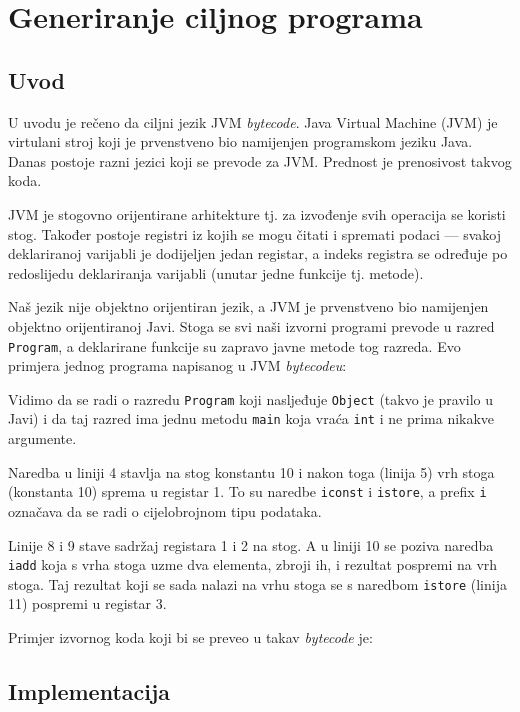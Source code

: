 \chapter{Generiranje ciljnog programa}

\section{Uvod}

U uvodu je rečeno da ciljni jezik JVM \emph{bytecode}. Java Virtual Machine (JVM) je virtulani stroj koji je prvenstveno
bio namijenjen programskom jeziku Java. Danas postoje razni jezici koji se prevode za JVM. Prednost je prenosivost
takvog koda.

JVM je stogovno orijentirane arhitekture tj. za izvođenje svih operacija se koristi stog. Također postoje 
registri iz kojih se mogu čitati i spremati podaci --- svakoj deklariranoj varijabli je dodijeljen jedan registar, a
indeks registra se određuje po redoslijedu deklariranja varijabli (unutar jedne funkcije tj. metode). 

Naš jezik nije objektno orijentiran jezik, a JVM je prvenstveno bio namijenjen objektno orijentiranoj Javi. Stoga
se svi naši izvorni programi prevode u razred \texttt{Program}, a deklarirane funkcije su zapravo javne metode
tog razreda. Evo primjera jednog programa napisanog u JVM \emph{bytecodeu}:



Vidimo da se radi o razredu \texttt{Program} koji nasljeđuje \texttt{Object} (takvo je pravilo u Javi)
i da taj razred ima jednu metodu \texttt{main} koja vraća \texttt{int} i ne prima nikakve argumente.

Naredba u liniji 4 stavlja na stog konstantu 10 i nakon toga (linija 5) vrh stoga (konstanta 10) sprema u registar 1.
To su naredbe \texttt{iconst} i \texttt{istore}, a prefix \texttt{i} označava da se radi o cijelobrojnom tipu podataka.

Linije 8 i 9 stave sadržaj registara 1 i 2 na stog. A u liniji 10 se poziva naredba \texttt{iadd} koja
s vrha stoga uzme dva elementa, zbroji ih, i rezultat pospremi na vrh stoga. Taj rezultat koji se sada
nalazi na vrhu stoga se s naredbom \texttt{istore} (linija 11) pospremi u registar 3.

Primjer izvornog koda koji bi se preveo u takav \emph{bytecode} je:



\section{Implementacija}

